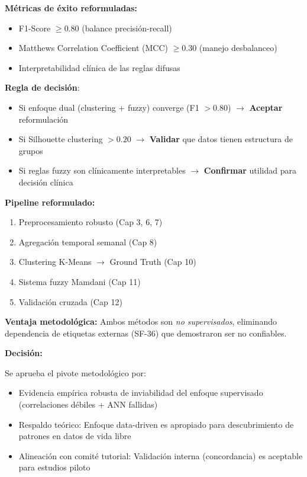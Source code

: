 \documentclass[12pt,letterpaper,twoside]{report}
\begin{document}
\begin{calculobox}
\begin{estadisticobox}
\textbf{Métricas de éxito reformuladas:}

\begin{itemize}[noitemsep]
    \item F1-Score $\geq 0.80$ (balance precisión-recall)
    \item Matthews Correlation Coefficient (MCC) $\geq 0.30$ (manejo desbalanceo)
    \item Interpretabilidad clínica de las reglas difusas
\end{itemize}
\end{estadisticobox}

\begin{reglabox}
\textbf{Regla de decisión}:

\begin{itemize}[noitemsep]
    \item Si enfoque dual (clustering + fuzzy) converge (F1 $> 0.80$) $\to$ \textbf{Aceptar} reformulación
    \item Si Silhouette clustering $> 0.20$ $\to$ \textbf{Validar} que datos tienen estructura de grupos
    \item Si reglas fuzzy son clínicamente interpretables $\to$ \textbf{Confirmar} utilidad para decisión clínica
\end{itemize}
\end{reglabox}

\begin{calculobox}
\textbf{Pipeline reformulado:}

\begin{enumerate}[noitemsep]
    \item Preprocesamiento robusto (Cap 3, 6, 7)
    \item Agregación temporal semanal (Cap 8)
    \item Clustering K-Means $\to$ Ground Truth (Cap 10)
    \item Sistema fuzzy Mamdani (Cap 11)
    \item Validación cruzada (Cap 12)
\end{enumerate}

\textbf{Ventaja metodológica:} Ambos métodos son \textit{no supervisados}, eliminando dependencia de etiquetas externas (SF-36) que demostraron ser no confiables.
\end{calculobox}

\begin{decisionbox}
\textbf{Decisión:}

Se aprueba el pivote metodológico por:
\begin{itemize}[noitemsep]
    \item Evidencia empírica robusta de inviabilidad del enfoque supervisado (correlaciones débiles + ANN fallidas)
    \item Respaldo teórico: Enfoque data-driven es apropiado para descubrimiento de patrones en datos de vida libre
    \item Alineación con comité tutorial: Validación interna (concordancia) es aceptable para estudios piloto
\end{itemize}
\end{decisionbox}


\end{calculobox}
\end{document}
